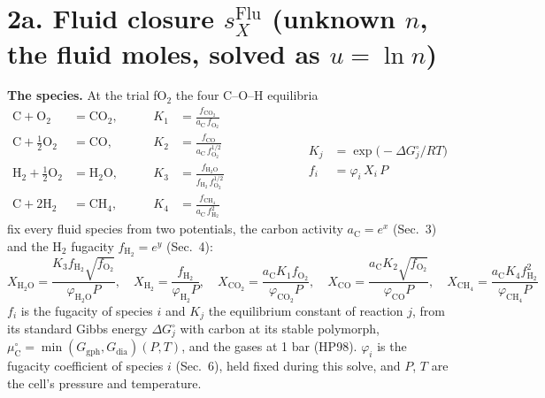 \documentclass[11pt]{article}
\newcommand{\fOt}{f_{\mathrm{O_2}}}
\newcommand{\fHt}{f_{\mathrm{H_2}}}
\newcommand{\aC}{a_{\mathrm{C}}}
\begin{document}
\section*{2a. Fluid closure $s_X^{\mathrm{Flu}}$ \quad (unknown $n$, the fluid moles, solved as $u=\ln n$)}
\vspace*{\fill}
{\small\setlength{\abovedisplayskip}{13pt}\setlength{\belowdisplayskip}{13pt}\setlength{\abovedisplayshortskip}{13pt}\setlength{\belowdisplayshortskip}{13pt}
\textbf{The species.} At the trial fO$_2$ the four C--O--H equilibria
\begin{equation*}
  \begin{aligned}
    \mathrm{C}+\mathrm{O_2}               &= \mathrm{CO_2}, & \qquad K_1 &= \frac{f_{\mathrm{CO_2}}}{\aC\,\fOt}\\[3pt]
    \mathrm{C}+\tfrac12\mathrm{O_2}       &= \mathrm{CO},   & \qquad K_2 &= \frac{f_{\mathrm{CO}}}{\aC\,\fOt^{1/2}}\\[3pt]
    \mathrm{H_2}+\tfrac12\mathrm{O_2}     &= \mathrm{H_2O}, & \qquad K_3 &= \frac{f_{\mathrm{H_2O}}}{\fHt\,\fOt^{1/2}}\\[3pt]
    \mathrm{C}+2\mathrm{H_2}              &= \mathrm{CH_4}, & \qquad K_4 &= \frac{f_{\mathrm{CH_4}}}{\aC\,\fHt^{2}}
  \end{aligned}
  \qquad\qquad\qquad
  \begin{aligned}
    K_j &= \exp\!\big(-\Delta G^\circ_j/RT\big)\\[6pt]
    f_i &= \varphi_i\,X_i\,P
  \end{aligned}
\end{equation*}
fix every fluid species from two potentials, the carbon activity $\aC=e^{x}$ (Sec.~3) and the H$_2$ fugacity $\fHt=e^{y}$ (Sec.~4):
\begin{equation}
  X_{\mathrm{H_2O}}=\frac{K_3\fHt\sqrt{\fOt}}{\varphi_{\mathrm{H_2O}}P},\quad
  X_{\mathrm{H_2}}=\frac{\fHt}{\varphi_{\mathrm{H_2}}P},\quad
  X_{\mathrm{CO_2}}=\frac{\aC K_1\fOt}{\varphi_{\mathrm{CO_2}}P},\quad
  X_{\mathrm{CO}}=\frac{\aC K_2\sqrt{\fOt}}{\varphi_{\mathrm{CO}}P},\quad
  X_{\mathrm{CH_4}}=\frac{\aC K_4\fHt^{2}}{\varphi_{\mathrm{CH_4}}P}
\end{equation}
$f_i$ is the fugacity of species $i$ and $K_j$ the equilibrium constant of reaction $j$, from its standard Gibbs energy $\Delta G^\circ_j$ with carbon at its stable polymorph, $\mu^\circ_{\mathrm C}=\min(G_{\mathrm{gph}},G_{\mathrm{dia}})(P,T)$, and the gases at 1 bar (HP98). $\varphi_i$ is the fugacity coefficient of species $i$ (Sec.~6), held fixed during this solve, and $P$, $T$ are the cell's pressure and temperature.

}
\end{document}

